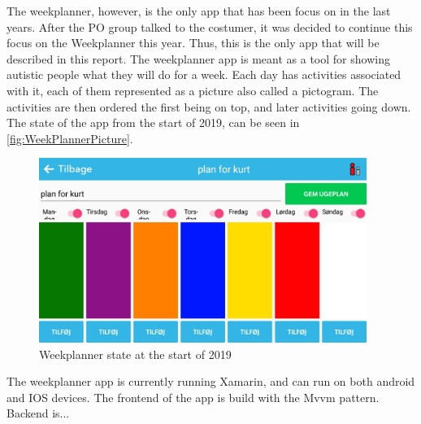 \par \noindent
The weekplanner, however, is the only app that has been focus on in the last years. After the \gls{PO} group talked to the costumer, it was decided to continue this focus on the Weekplanner this year. Thus, this is the only app that will be described in this report.  \newline
The weekplanner app is meant as a tool for showing autistic people what they will do for a week. Each day has activities associated with it, each of them represented as a picture also called a pictogram. The activities are then ordered the first being on top, and later activities going down. The state of the app from the start of 2019, can be seen in \autoref{fig:WeekPlannerPicture}.

\begin{figure}[ht]
        \begin{center}
            \includegraphics[width=0.95\textwidth]{figures/WeekPlannerPicture}
        \end{center}
        \caption{Weekplanner state at the start of 2019}
        \label{fig:WeekPlannerPicture}
\end{figure}

\noindent
The weekplanner app is currently running Xamarin, and can run on both android and IOS devices. The frontend of the app is build with the \gls{Mvvm} pattern. 
Backend is... %
